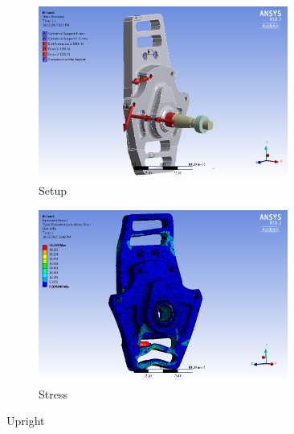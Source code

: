 \documentclass[10pt]{article}
\begin{document}
\begin{figure}[H]
\centering
\begin{subfigure}[b]{.48\textwidth}
\centering
\includegraphics[width=0.9\textwidth]{figures/fea/parts/MS00019-Upright-Setup}
\caption{Setup}
\end{subfigure}
\begin{subfigure}[b]{.48\textwidth}
\centering
\includegraphics[width=0.9\textwidth]{figures/fea/parts/MS00019-Upright-Stress}
\caption{Stress}
\end{subfigure}
\caption{Upright}
\label{fig:MS00019-Upright}
\end{figure}
\end{document}
